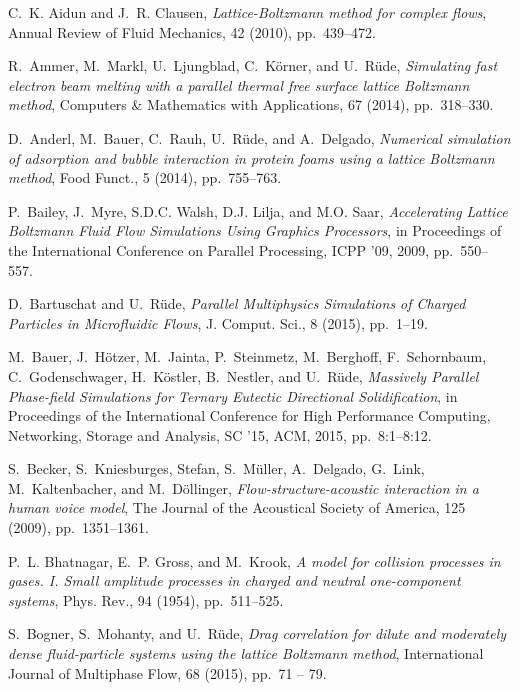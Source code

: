 \documentclass[final,leqno,onefignum,onetabnum]{siamltex1213}
\begin{document}

\begin{thebibliography}{10}

{\sc C.~K. Aidun and J.~R. Clausen}, {\em Lattice-{Boltzmann} method for
  complex flows}, Annual Review of Fluid Mechanics, 42 (2010), pp.~439--472.

{\sc R.~Ammer, M.~Markl, U.~Ljungblad, C.~K{\"o}rner, and U.~R{\"u}de}, {\em
  Simulating fast electron beam melting with a parallel thermal free surface
  lattice {Boltzmann} method}, Computers \& Mathematics with Applications, 67
  (2014), pp.~318--330.

{\sc D.~Anderl, M.~Bauer, C.~Rauh, U.~Rüde, and A.~Delgado}, {\em Numerical
  simulation of adsorption and bubble interaction in protein foams using a
  lattice {Boltzmann} method}, Food Funct., 5 (2014), pp.~755--763.

{\sc P.~Bailey, J.~Myre, S.D.C. Walsh, D.J. Lilja, and M.O. Saar}, {\em
  {Accelerating Lattice Boltzmann Fluid Flow Simulations Using Graphics
  Processors}}, in Proceedings of the International Conference on Parallel
  Processing, ICPP '09, 2009, pp.~550--557.

{\sc D.~Bartuschat and U.~R\"ude}, {\em {Parallel Multiphysics Simulations of
  Charged Particles in Microfluidic Flows}}, J. Comput. Sci., 8 (2015),
  pp.~1--19.

{\sc M.~Bauer, J.~H{\"o}tzer, M.~Jainta, P.~Steinmetz, M.~Berghoff,
  F.~Schornbaum, C.~Godenschwager, H.~K{\"o}stler, B.~Nestler, and
  U.~R{\"u}de}, {\em {Massively Parallel Phase-field Simulations for Ternary
  Eutectic Directional Solidification}}, in Proceedings of the International
  Conference for High Performance Computing, Networking, Storage and Analysis,
  SC '15, ACM, 2015, pp.~8:1--8:12.

{\sc S.~Becker, S.~Kniesburges, Stefan, S.~Müller, A.~Delgado, G.~Link,
  M.~Kaltenbacher, and M.~Döllinger}, {\em Flow-structure-acoustic interaction
  in a human voice model}, The Journal of the Acoustical Society of America,
  125 (2009), pp.~1351--1361.

{\sc P.~L. Bhatnagar, E.~P. Gross, and M.~Krook}, {\em A model for collision
  processes in gases. {I}. {S}mall amplitude processes in charged and neutral
  one-component systems}, Phys. Rev., 94 (1954), pp.~511--525.

{\sc S.~Bogner, S.~Mohanty, and U.~Rüde}, {\em Drag correlation for dilute and
  moderately dense fluid-particle systems using the lattice {Boltzmann}
  method}, International Journal of Multiphase Flow, 68 (2015), pp.~71 -- 79.


\end{thebibliography}
\end{document}
